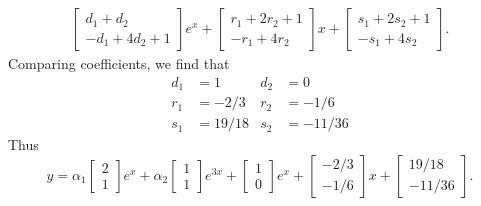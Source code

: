 \begin{soln}
\begin{align*}
        \begin{bmatrix} d_1+d_2 \\ -d_1+4d_2+1\end{bmatrix}e^x +\begin{bmatrix} r_1+2r_2+1 \\ -r_1+4r_2 \end{bmatrix}x+
        \begin{bmatrix} s_1+2s_2+1 \\ -s_1+4s_2 \end{bmatrix}.
    \end{align*}
    Comparing coefficients, we find that 
    \begin{align*}
        d_1 &= 1 &d_2 &= 0 \\
        r_1 &=-2/3 &r_2 &= -1/6 \\
        s_1 &= 19/18 &s_2 &= -11/36
    \end{align*}
    Thus $$\boxed{y=\alpha_1\begin{bmatrix} 2 \\ 1 \end{bmatrix}e^x + \alpha_2 \begin{bmatrix} 1 \\ 1 \end{bmatrix}e^{3x}
    +\begin{bmatrix} 1 \\ 0 \end{bmatrix} e^x + \begin{bmatrix} -2/3 \\ -1/6 \end{bmatrix}x
+\begin{bmatrix} 19/18 \\ -11/36 \end{bmatrix}}.$$
\end{soln}

